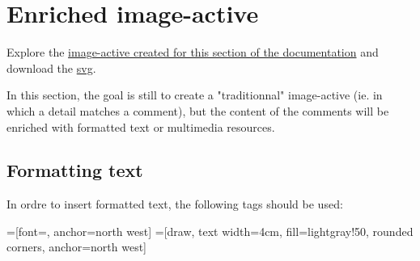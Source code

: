 \section{Enriched image-active}

Explore the \href{http://images-actives.crdp-versailles.fr/beta/demo/tuto/xia2}{image-active 
created for this section of the documentation} and download the 
\href{http://images-actives.crdp-versailles.fr/beta/demo/tuto/xia2/svg/xia2.svg}{svg}.

In this section, the goal is still to create a "traditionnal" image-active 
(ie. in which a detail matches a comment), but the content of the comments 
will be enriched with  formatted text or multimedia resources.

\subsection{Formatting text}

In ordre to insert formatted text, the following tags should be used:

=[font=\sffamily, anchor=north west]
=[draw, text width=4cm, fill=lightgray!50, rounded corners, anchor=north west]

